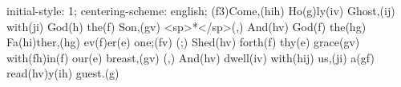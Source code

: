 initial-style: 1;
centering-scheme: english;
(f3)Come,(hih) Ho(g)ly(iv) Ghost,(ij) with(ji) God(h) the(f) Son,(gv) <sp>*</sp>(,)
And(hv) God(f) the(hg) Fa(hi)ther,(hg) ev(f)er(e) one;(fv) (;)
Shed(hv) forth(f) thy(e) grace(gv) with(fh)in(f) our(e) breast,(gv) (,)
And(hv) dwell(iv) with(hij) us,(ji) a(gf) read(hv)y(ih) guest.(g)

